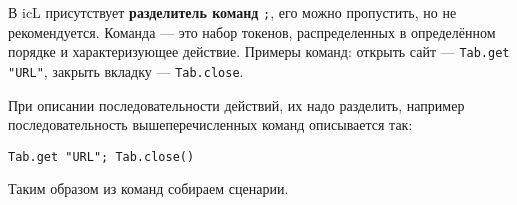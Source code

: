 \begin{sourcecode}
	\label{unreadable}
    \inputminted[linenos]{icl}{../sources/unreadable.icL}
\end{sourcecode}

В icL присутствует \textbf{разделитель команд} \texttt{;}, его можно пропустить, но не рекомендуется. Команда — это набор токенов, распределенных в определённом порядке и характеризующее действие. Примеры команд: открыть сайт — \texttt{Tab.get "URL"}, закрыть вкладку — \texttt{Tab.close}.

При описании последовательности действий, их надо разделить, например последовательность вышеперечисленных команд описывается так:
\begin{verbatim}
Tab.get "URL"; Tab.close()
\end{verbatim}

Таким образом из команд собираем сценарии.

\begin{sourcecode}
	\label{readable}
    \inputminted[linenos]{icl}{../sources/readable.icL}
\end{sourcecode}
